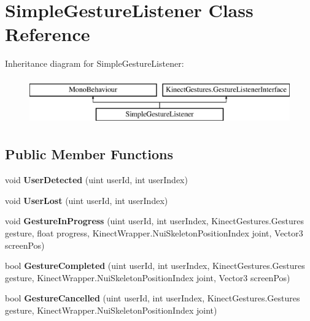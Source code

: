 \hypertarget{class_simple_gesture_listener}{}\section{Simple\+Gesture\+Listener Class Reference}
\label{class_simple_gesture_listener}
Inheritance diagram for Simple\+Gesture\+Listener\+:\begin{figure}[H]
\begin{center}
\leavevmode
\includegraphics[height=2.000000cm]{class_simple_gesture_listener}
\end{center}
\end{figure}
\subsection*{Public Member Functions}
\begin{DoxyCompactItemize}
\item 
\mbox{\label{class_simple_gesture_listener_a238368ecfe2e1b468fc1a9ad782f98f4}} 
void {\bfseries User\+Detected} (uint user\+Id, int user\+Index)
\item 
\mbox{\label{class_simple_gesture_listener_a07c561adab62aaf1c1c3400658ebdeab}} 
void {\bfseries User\+Lost} (uint user\+Id, int user\+Index)
\item 
\mbox{\label{class_simple_gesture_listener_a990029099c7e7bc9c45048ee0c10bf2f}} 
void {\bfseries Gesture\+In\+Progress} (uint user\+Id, int user\+Index, Kinect\+Gestures.\+Gestures gesture, float progress, Kinect\+Wrapper.\+Nui\+Skeleton\+Position\+Index joint, Vector3 screen\+Pos)
\item 
\mbox{\label{class_simple_gesture_listener_a72f86d012490f080a4334152757ce2e9}} 
bool {\bfseries Gesture\+Completed} (uint user\+Id, int user\+Index, Kinect\+Gestures.\+Gestures gesture, Kinect\+Wrapper.\+Nui\+Skeleton\+Position\+Index joint, Vector3 screen\+Pos)
\item 
\mbox{\label{class_simple_gesture_listener_ad65cddbc8d881020088b42edc9708434}} 
bool {\bfseries Gesture\+Cancelled} (uint user\+Id, int user\+Index, Kinect\+Gestures.\+Gestures gesture, Kinect\+Wrapper.\+Nui\+Skeleton\+Position\+Index joint)
\end{DoxyCompactItemize}
